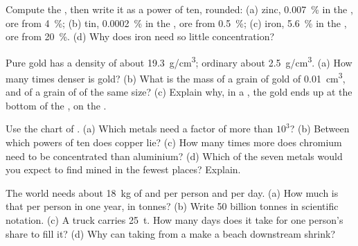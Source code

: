 \begin{exercise}[$\star\star$]\label{exo:g9:earth-resources:5}
Compute the , then write it as a power of ten, rounded:
(a) zinc, \qty{0.007}{\%} in the , ore from \qty{4}{\%}; (b) tin,
\qty{0.0002}{\%} in the , ore from \qty{0.5}{\%}; (c) iron,
\qty{5.6}{\%} in the , ore from \qty{20}{\%}. (d) Why does iron need
so little concentration?
\end{exercise}

\begin{exercise}[$\star\star$]\label{exo:g9:earth-resources:6}
Pure gold has a density of about \qty{19.3}{g/cm^3}; ordinary  about
\qty{2.5}{g/cm^3}. (a) How many times denser is gold? (b) What is the mass
of a grain of gold of \qty{0.01}{cm^3}, and of a grain of  of the same
size? (c) Explain why, in a , the gold ends up at the bottom of the
, on the .
\end{exercise}

\begin{exercise}[$\star\star$]\label{exo:g9:earth-resources:7}
Use the chart of . (a) Which metals need a factor of
more than $10^3$? (b) Between which powers of ten does copper lie? (c) How
many times more does chromium need to be concentrated than aluminium?
(d) Which of the seven metals would you expect to find mined in the
fewest places? Explain.
\end{exercise}

\begin{exercise}[$\star\star$]\label{exo:g9:earth-resources:8}
The world needs about \qty{18}{kg} of  and  per person and per
day. (a) How much is that per person in one year, in tonnes? (b) Write 50
billion tonnes in scientific notation. (c) A truck carries \qty{25}{t}.
How many days does it take for one person's share to fill it? (d) Why can taking 
from a  make a beach downstream shrink?
\end{exercise}

